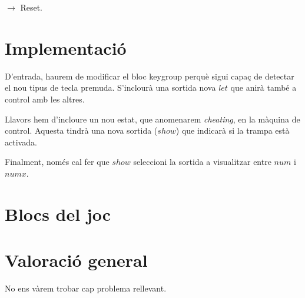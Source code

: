 \begin{multicols}{2}

$\rightarrow$ Reset.


\keypress{\#}






\keypress{*}






\keypress{*}










\keypress{*}


\end{multicols}


\section{Implementació}

D'entrada, haurem de modificar el bloc \textsf{keygroup} perquè sigui capaç de detectar el nou tipus de tecla premuda.
S'inclourà una sortida nova $let$ que anirà també a \textsf{control} amb les altres.

Llavors hem d'incloure un nou estat, que anomenarem \emph{cheating}, en la màquina de control.
Aquesta tindrà una nova sortida ($show$) que indicarà si la trampa està activada.

Finalment, només cal fer que $show$ seleccioni la sortida a visualitzar entre $num$ i $numx$.

\section{Blocs del joc}

\section{Valoració general}

No ens vàrem trobar cap problema rellevant.

